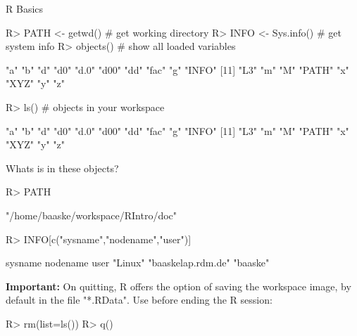 \documentclass[10pt]{beamer}
\let\proglang=\textsf
\begin{document}
\begin{frame}[fragile]{\proglang{R} Basics}
\begin{Schunk}
\begin{Sinput}
R> PATH <- getwd()        # get working directory
R> INFO <- Sys.info()     # get system info  
R> objects()              # show all loaded variables
\end{Sinput}
\begin{Soutput}
 [1] "a"    "b"    "d"    "d0"   "d.0"  "d00"  "dd"   "fac"  "g"    "INFO"
[11] "L3"   "m"    "M"    "PATH" "x"    "XYZ"  "y"    "z"   
\end{Soutput}
\begin{Sinput}
R> ls()                   # objects in your workspace
\end{Sinput}
\begin{Soutput}
 [1] "a"    "b"    "d"    "d0"   "d.0"  "d00"  "dd"   "fac"  "g"    "INFO"
[11] "L3"   "m"    "M"    "PATH" "x"    "XYZ"  "y"    "z"   
\end{Soutput}
\end{Schunk}
Whats is in these objects?
\begin{Schunk}
\begin{Sinput}
R> PATH
\end{Sinput}
\begin{Soutput}
[1] "/home/baaske/workspace/RIntro/doc"
\end{Soutput}
\begin{Sinput}
R> INFO[c("sysname","nodename","user")]
\end{Sinput}
\begin{Soutput}
           sysname           nodename               user 
           "Linux" "baaskelap.rdm.de"           "baaske" 
\end{Soutput}
\end{Schunk}
\textbf{Important:} On quitting, R offers the option of saving the workspace
image, by default in the file "*.RData". Use before ending the R session:
\begin{Schunk}
\begin{Sinput}
R> rm(list=ls())
R> q()
\end{Sinput}
\end{Schunk}
\end{frame}
%
\end{document}
